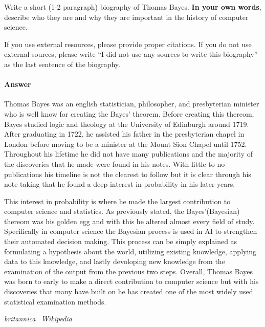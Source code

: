 \documentclass{article}
\begin{document}

Write a short (1-2 paragraph) biography of Thomas Bayes.
\textbf{In your own words}, describe who they are and why they are important in
the history of computer science.

If you use external resources, please provide
proper citations. If you do not use external sources, please write ``I did not
use any sources to write this biography'' as the last sentence of the
biography.

\paragraph{Answer}

Thomas Bayes was an english statistician, philosopher, and presbyterian minister who is well know for creating the Bayes' theorem. 
Before creating this thereom, Bayes studied logic and theology at the University of Edinburgh around 1719. After graduating in 1722, 
he assisted his father in the presbyterian chapel in London before moving to be a minister at the Mount Sion Chapel until 1752. 
Throughout his lifetime he did not have many publications and the majority of the discoveries that he made were found in his notes. 
With little to no publications his timeline is not the clearest to follow but it is clear through his note taking that he found a deep 
interest in probability in his later years.

This interest in probability is where he made the largest contribution to computer science and statistics. As previously stated, the Bayes'(Bayesian) thereom
was his golden egg and with this he altered almost every field of study. Specifically in computer science the Bayesian process is used in AI to strengthen their automated decision making.
This process can be simply explained as formulating a hypothesis about the world, utilizing existing knowledge, applying data to this knowledge, and lastly devoloping new knowledge from the
examination of the output from the previous two steps. Overall, Thomas Bayes was born to early to make a direct contribution to computer science but with his discoveries that many have built on 
he has created one of the most widely used statistical examination methods.

\emph{britannica}~\cite{britannica}
\emph{Wikipedia}~\cite{wikipedia}


 \newpage
 
 
\end{document}
